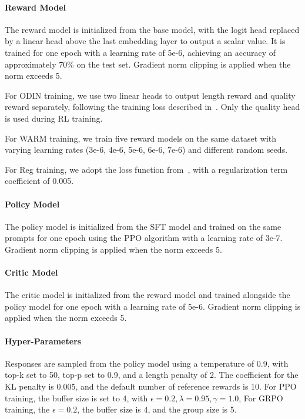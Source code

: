 \paragraph{Reward Model}
The reward model is initialized from the base model, with the logit head replaced by a linear head above the last embedding layer to output a scalar value. It is trained for one epoch with a learning rate of 5e-6, achieving an accuracy of approximately 70\% on the test set. Gradient norm clipping is applied when the norm exceeds 5.

For ODIN training, we use two linear heads to output length reward and quality reward separately, following the training loss described in~\citet{Chen2024ODINDR}. Only the quality head is used during RL training.

For WARM training, we train five reward models on the same dataset with varying learning rates (3e-6, 4e-6, 5e-6, 6e-6, 7e-6) and different random seeds.

For Reg training, we adopt the loss function from~\cite{Dai2023SafeRS}, with a regularization term coefficient of 0.005.

\paragraph{Policy Model}
The policy model is initialized from the SFT model and trained on the same prompts for one epoch using the PPO algorithm with a learning rate of 3e-7. Gradient norm clipping is applied when the norm exceeds 5.

\paragraph{Critic Model}
The critic model is initialized from the reward model and trained alongside the policy model for one epoch with a learning rate of 5e-6. Gradient norm clipping is applied when the norm exceeds 5.

\paragraph{Hyper-Parameters}
Responses are sampled from the policy model using a temperature of 0.9, with top-k set to 50, top-p set to 0.9, and a length penalty of 2. The coefficient for the KL penalty is 0.005, and the default number of reference rewards is 10. For PPO training, the buffer size is set to 4, with $\epsilon=0.2,\lambda=0.95,\gamma=1.0$, For GRPO training, the $\epsilon=0.2$, the buffer size is 4, and the group size is 5.

